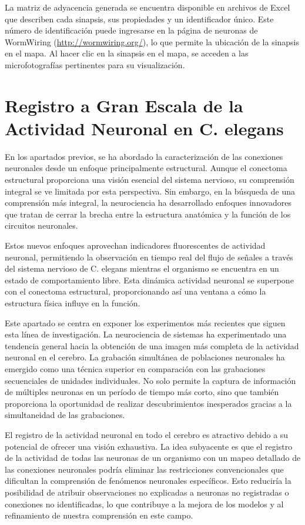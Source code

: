 La matriz de adyacencia generada se encuentra disponible en archivos de Excel que describen cada sinapsis, sus propiedades y un identificador único. Este número de identificación puede ingresarse en la página de neuronas de WormWiring (\url{http://wormwiring.org/}), lo que permite la ubicación de la sinapsis en el mapa. Al hacer clic en la sinapsis en el mapa, se acceden a las microfotografías pertinentes para su visualización.



\section{ Registro a Gran Escala de la Actividad Neuronal en C. elegans}


En los apartados  previos, se ha abordado la caracterización de las conexiones neuronales desde un enfoque principalmente estructural. Aunque el conectoma estructural proporciona una visión esencial del sistema nervioso, su comprensión integral se ve limitada por esta perspectiva.  Sin embargo, en la búsqueda de una comprensión más integral, la neurociencia ha desarrollado enfoques innovadores que tratan de cerrar la brecha entre la estructura anatómica y la función de los circuitos neuronales.

Estos nuevos enfoques aprovechan indicadores fluorescentes de actividad neuronal, permitiendo la observación en tiempo real del flujo de señales a través del sistema nervioso de C. elegans mientras el organismo se encuentra en un estado de comportamiento libre. Esta dinámica actividad neuronal se superpone con el conectoma estructural, proporcionando así una ventana a cómo la estructura física influye en la función.

Este apartado se centra en exponer los experimentos más recientes que siguen esta línea de investigación. La neurociencia de sistemas ha experimentado una tendencia general hacia la obtención de una imagen más completa de la actividad neuronal en el cerebro. La grabación simultánea de poblaciones neuronales ha emergido como una técnica superior en comparación con las grabaciones secuenciales de unidades individuales. No solo permite la captura de información de múltiples neuronas en un período de tiempo más corto, sino que también proporciona la oportunidad de realizar descubrimientos inesperados gracias a la simultaneidad de las grabaciones.


El registro de la actividad neuronal en todo el cerebro es atractivo debido a su potencial de ofrecer una visión exhaustiva. La idea subyacente es que el registro de la actividad de todas las neuronas de un organismo con un mapeo detallado de las conexiones neuronales podría eliminar las restricciones convencionales que dificultan la comprensión de fenómenos neuronales específicos. Esto reduciría la posibilidad de atribuir observaciones no explicadas a neuronas no registradas o conexiones no identificadas, lo que contribuye a la mejora de los modelos y al refinamiento de nuestra comprensión en este campo.


